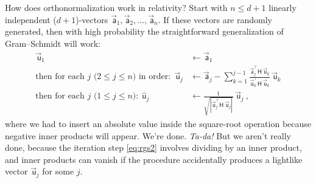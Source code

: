 \documentclass{article}
\newcommand{\metric}{\mathsf{H}}
\newcommand\upvec[1]{\!\vec{\,\mathrm{#1}}}
\newcommand{\Lvec}[1]{\upvec{\mathsf{#1}}} %
\newcommand{\Lhat}[1]{\hat{\mathsf{#1}}} %
\newcommand{\plus}{\!+\!} %
\begin{document}
How does orthonormalization work in relativity?
Start with $n\leq d+1$ linearly independent ($d\plus1$)-vectors $\Lvec{a}_1,\Lvec{a}_2,\ldots,\Lvec{a}_n$.
If these vectors are randomly generated, then with high probability the straightforward generalization of Gram--Schmidt will work:
\begin{align}
    \Lvec{u}_1 &\leftarrow \Lvec{a}_1 \label{eq:rgs1}
    \\
    \mbox{then for each $j$ ($2\leq j\leq n$) in order:} ~~ \Lvec{u}_j &\leftarrow \Lvec{a}_j - \sum_{k=1}^{j-1} \frac{\Lvec{a}_j^\top\metric\,\Lvec{u}_k}{\Lvec{u}_k^\top\metric\,\Lvec{u}_k}\,\Lvec{u}_k \label{eq:rgs2}
    \\
    \mbox{then for each $j$ ($1\leq j\leq n$):} ~~ \Lhat{u}_j &\leftarrow \frac{1}{\sqrt{|\Lvec{u}_j^\top\metric\,\Lvec{u}_j|}}\,\Lvec{u}_j ~, \label{eq:rgs3}
\end{align}
where we had to insert an absolute value inside the square-root operation because negative inner products will appear.
We're done. \emph{Ta-da!}
But we aren't really done, because the iteration step \eqref{eq:rgs2} involves dividing by an inner product, and inner products can vanish if the procedure accidentally produces a lightlike vector $\Lvec{u}_j$ for some $j$.
\end{document}
